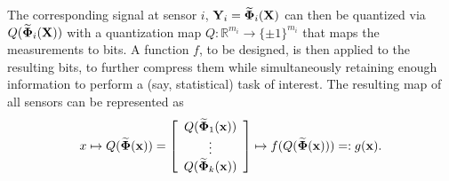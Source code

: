 The corresponding signal at sensor $i$, $\mathbf{Y}_i = \widetilde{\mathbf{\Phi}}_i (\mathbf{X})$ can then be quantized via ${Q}(\widetilde{\mathbf{\Phi}}_i (\mathbf{X}))$ with a quantization map $Q: \mathbb{R}^{m_i} \to \{\pm 1\}^{m_i} $ that maps the measurements to bits. A function $f$, to be designed, is then applied to the resulting bits, to further compress them while simultaneously retaining enough information to perform a (say, statistical) task of interest.  The resulting map of all sensors can be represented as
\begin{equation}\label{eq:binaryembedding}
x 
\mapsto Q(\widetilde\transfer (\x)) =\left[ \begin{array}{c} Q(\widetilde\transfer_1 (\x)) \\ \vdots \\ Q(\widetilde\transfer_k (\x)) \end{array}\right] \mapsto f(Q(\widetilde\transfer (\x)))=: g(\x).%
\end{equation}




